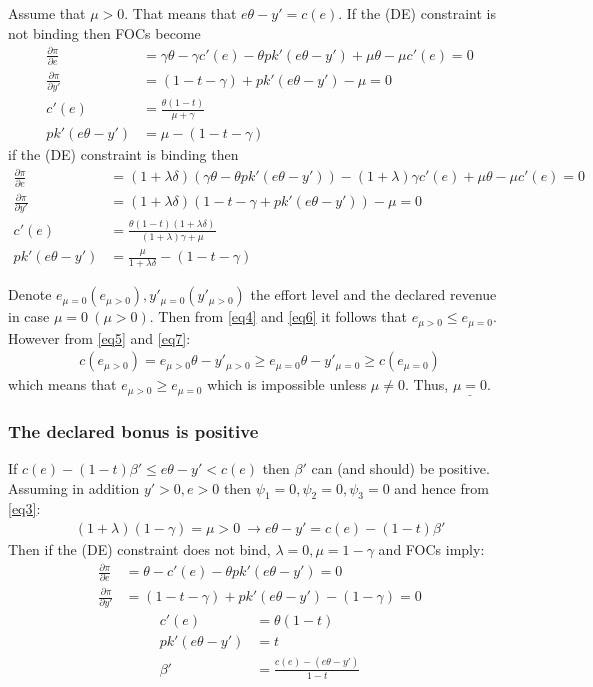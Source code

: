 \documentclass[a4paper]{article}
\begin{document}
Assume that $\mu > 0$. That means that $e\theta - y' = c(e)$. If the (DE) constraint is not binding then FOCs become
\begin{align}
\frac{\partial \pi}{\partial e} &= \gamma \theta- \gamma c'(e) - \theta p k'(e \theta - y') + \mu \theta - \mu c'(e) = 0\nonumber\\
\frac{\partial \pi}{\partial y'} &= (1 - t - \gamma)+pk'(e\theta - y') - \mu  = 0\nonumber\\
c'(e) &= \frac{\theta(1 - t)}{\mu + \gamma}\label{eq6}\\
pk'(e\theta - y') &= \mu - (1 - t - \gamma)\label{eq7}
\end{align}
if the (DE) constraint is binding then 
\begin{align*}
\frac{\partial \pi}{\partial e} &= (1 + \lambda \delta)(\gamma \theta - \theta p k'(e \theta - y')) - (1+\lambda) \gamma c'(e)+ \mu \theta - \mu c'(e) = 0\\
\frac{\partial \pi}{\partial y'} &= (1+\lambda \delta)(1 - t - \gamma+pk'(e\theta - y')) - \mu = 0\\
c'(e) &= \frac{\theta(1-t)(1+\lambda \delta)}{(1 + \lambda)\gamma + \mu}\\
pk'(e\theta - y') &= \frac{\mu}{1+\lambda \delta} - (1 - t- \gamma)
\end{align*}

Denote $e_{\mu = 0}(e_{\mu > 0}), y'_{\mu=0}(y'_{\mu>0})$ the effort level and the declared revenue in case $\mu = 0\ (\mu > 0)$. Then from \eqref{eq4} and \eqref{eq6} it follows that $e_{\mu >0} \le e_{\mu = 0}$. However from \eqref{eq5} and \eqref{eq7}:
\begin{align*}
c(e_{\mu > 0}) = e_{\mu>0}\theta - y'_{\mu>0} \ge e_{\mu=0}\theta - y'_{\mu=0} \ge c(e_{\mu=0})
\end{align*}
which means that $e_{\mu>0} \ge e_{\mu = 0}$ which is impossible unless $\mu \neq 0$. Thus, $\underline{\mu = 0}$.
\subsubsection{The declared bonus is positive}
If $c(e) - (1-t)\beta' \le e \theta - y' < c(e)$ then $\beta'$ can (and should) be positive.
Assuming in addition $y' > 0, e > 0$ then $\psi_1 = 0, \psi_2 = 0, \psi_3= 0$ and hence from \eqref{eq3}:
\begin{align*}
(1 + \lambda)(1 - \gamma) = \mu > 0\ \to e \theta - y' = c(e) - (1 - t)\beta'
\end{align*}
Then if the (DE) constraint does not bind, $\lambda = 0, \mu = 1 - \gamma$ and FOCs imply:
\begin{align*}
\frac{\partial \pi}{\partial e} &= \theta - c'(e) - \theta p k'(e\theta - y') = 0\\
\frac{\partial \pi}{\partial y'} &= (1 - t - \gamma)+pk'(e\theta - y') - (1-\gamma) = 0
\end{align*}
\begin{align*}
c'(e) &= \theta(1 - t)\\
pk'(e\theta - y') &= t\\
\beta' &= \frac{c(e) - (e\theta - y')}{1-t}
\end{align*}
\end{document}
